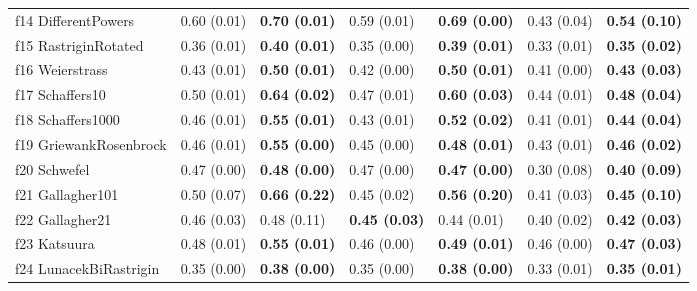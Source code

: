 \begin{table}
\begin{tabular}{lllllll}
f14 DifferentPowers & 0.60 (0.01) & \textbf{0.70 (0.01)} & 0.59 (0.01) & \textbf{0.69 (0.00)} & 0.43 (0.04) & \textbf{0.54 (0.10)} \\
f15 RastriginRotated & 0.36 (0.01) & \textbf{0.40 (0.01)} & 0.35 (0.00) & \textbf{0.39 (0.01)} & 0.33 (0.01) & \textbf{0.35 (0.02)} \\
f16 Weierstrass & 0.43 (0.01) & \textbf{0.50 (0.01)} & 0.42 (0.00) & \textbf{0.50 (0.01)} & 0.41 (0.00) & \textbf{0.43 (0.03)} \\
f17 Schaffers10 & 0.50 (0.01) & \textbf{0.64 (0.02)} & 0.47 (0.01) & \textbf{0.60 (0.03)} & 0.44 (0.01) & \textbf{0.48 (0.04)} \\
f18 Schaffers1000 & 0.46 (0.01) & \textbf{0.55 (0.01)} & 0.43 (0.01) & \textbf{0.52 (0.02)} & 0.41 (0.01) & \textbf{0.44 (0.04)} \\
f19 GriewankRosenbrock & 0.46 (0.01) & \textbf{0.55 (0.00)} & 0.45 (0.00) & \textbf{0.48 (0.01)} & 0.43 (0.01) & \textbf{0.46 (0.02)} \\
f20 Schwefel & 0.47 (0.00) & \textbf{0.48 (0.00)} & 0.47 (0.00) & \textbf{0.47 (0.00)} & 0.30 (0.08) & \textbf{0.40 (0.09)} \\
f21 Gallagher101 & 0.50 (0.07) & \textbf{0.66 (0.22)} & 0.45 (0.02) & \textbf{0.56 (0.20)} & 0.41 (0.03) & \textbf{0.45 (0.10)} \\
f22 Gallagher21 & 0.46 (0.03) & 0.48 (0.11) & \textbf{0.45 (0.03)} & 0.44 (0.01) & 0.40 (0.02) & \textbf{0.42 (0.03)} \\
f23 Katsuura & 0.48 (0.01) & \textbf{0.55 (0.01)} & 0.46 (0.00) & \textbf{0.49 (0.01)} & 0.46 (0.00) & \textbf{0.47 (0.03)} \\
f24 LunacekBiRastrigin & 0.35 (0.00) & \textbf{0.38 (0.00)} & 0.35 (0.00) & \textbf{0.38 (0.00)} & 0.33 (0.01) & \textbf{0.35 (0.01)} \\
\bottomrule
\end{tabular}
\end{table}
